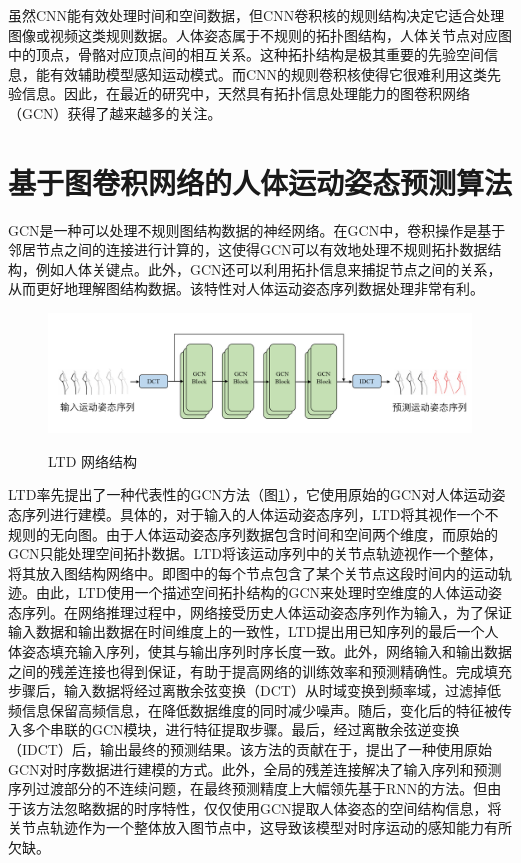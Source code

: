 虽然CNN能有效处理时间和空间数据，但CNN卷积核的规则结构决定它适合处理图像或视频这类规则数据。人体姿态属于不规则的拓扑图结构，人体关节点对应图中的顶点，骨骼对应顶点间的相互关系。这种拓扑结构是极其重要的先验空间信息，能有效辅助模型感知运动模式。而CNN的规则卷积核使得它很难利用这类先验信息。因此，在最近的研究中，天然具有拓扑信息处理能力的图卷积网络（GCN）获得了越来越多的关注。


\section{基于图卷积网络的人体运动姿态预测算法}
GCN是一种可以处理不规则图结构数据的神经网络。在GCN中，卷积操作是基于邻居节点之间的连接进行计算的，这使得GCN可以有效地处理不规则拓扑数据结构，例如人体关键点。此外，GCN还可以利用拓扑信息来捕捉节点之间的关系，从而更好地理解图结构数据。该特性对人体运动姿态序列数据处理非常有利。

\begin{figure}[ht]
    \centering
    \includegraphics[width=1\textwidth]{FigMa/LTD.png}\\
    \vspace{-0.3cm}
    \caption{LTD 网络结构}
    \label{fig:LTD}
\end{figure}

LTD\parencite{mao2019learning}率先提出了一种代表性的GCN方法（图\ref{fig:LTD}），它使用原始的GCN对人体运动姿态序列进行建模。具体的，对于输入的人体运动姿态序列，LTD将其视作一个不规则的无向图。由于人体运动姿态序列数据包含时间和空间两个维度，而原始的GCN只能处理空间拓扑数据。LTD将该运动序列中的关节点轨迹视作一个整体，将其放入图结构网络中。即图中的每个节点包含了某个关节点这段时间内的运动轨迹。由此，LTD使用一个描述空间拓扑结构的GCN来处理时空维度的人体运动姿态序列。在网络推理过程中，网络接受历史人体运动姿态序列作为输入，为了保证输入数据和输出数据在时间维度上的一致性，LTD提出用已知序列的最后一个人体姿态填充输入序列，使其与输出序列时序长度一致。此外，网络输入和输出数据之间的残差连接也得到保证，有助于提高网络的训练效率和预测精确性。完成填充步骤后，输入数据将经过离散余弦变换（DCT）从时域变换到频率域，过滤掉低频信息保留高频信息，在降低数据维度的同时减少噪声。随后，变化后的特征被传入多个串联的GCN模块，进行特征提取步骤。最后，经过离散余弦逆变换（IDCT）后，输出最终的预测结果。该方法的贡献在于，提出了一种使用原始GCN对时序数据进行建模的方式。此外，全局的残差连接解决了输入序列和预测序列过渡部分的不连续问题，在最终预测精度上大幅领先基于RNN的方法。但由于该方法忽略数据的时序特性，仅仅使用GCN提取人体姿态的空间结构信息，将关节点轨迹作为一个整体放入图节点中，这导致该模型对时序运动的感知能力有所欠缺。

